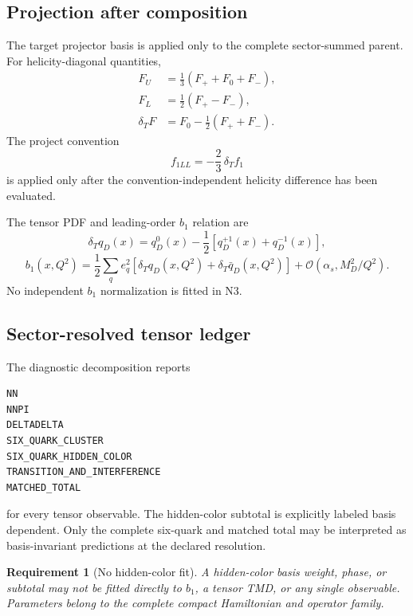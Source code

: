 \documentclass[11pt]{article}
\newtheorem{requirement}[definition]{Requirement}
\newcommand{\cO}{\mathcal O}
\begin{document}
\subsection{Projection after composition}

The target projector basis is applied only to the complete sector-summed parent.  For helicity-diagonal quantities,
\begin{align}
 F_U&=\frac13(F_++F_0+F_-),\\
 F_L&=\frac12(F_+-F_-),\\
 \delta_TF&=F_0-\frac12(F_++F_-).
\label{eq:n3-helicity-combinations}
\end{align}
The project convention
\begin{equation}
 f_{1LL}=-\frac23\,\delta_Tf_1
\label{eq:n3-f1ll-adapter}
\end{equation}
is applied only after the convention-independent helicity difference has been evaluated.

The tensor PDF and leading-order \(b_1\) relation are
\begin{equation}
 \delta_Tq_D(x)
 =q_D^{0}(x)-\frac12[q_D^{+1}(x)+q_D^{-1}(x)],
\label{eq:n3-tensor-pdf}
\end{equation}
\begin{equation}
 b_1(x,Q^2)
 =\frac12\sum_q e_q^2
 \left[\delta_Tq_D(x,Q^2)+\delta_T\bar q_D(x,Q^2)\right]
 +\cO(\alpha_s,M_D^2/Q^2).
\label{eq:n3-b1}
\end{equation}
No independent \(b_1\) normalization is fitted in N3.

\subsection{Sector-resolved tensor ledger}

The diagnostic decomposition reports
\begin{verbatim}
NN
NNPI
DELTADELTA
SIX_QUARK_CLUSTER
SIX_QUARK_HIDDEN_COLOR
TRANSITION_AND_INTERFERENCE
MATCHED_TOTAL
\end{verbatim}
for every tensor observable.  The hidden-color subtotal is explicitly labeled basis dependent.  Only the complete six-quark and matched total may be interpreted as basis-invariant predictions at the declared resolution.

\begin{requirement}[No hidden-color fit]
A hidden-color basis weight, phase, or subtotal may not be fitted directly to \(b_1\), a tensor TMD, or any single observable.  Parameters belong to the complete compact Hamiltonian and operator family.
\label{req:no-hidden-fit}
\end{requirement}
\end{document}
